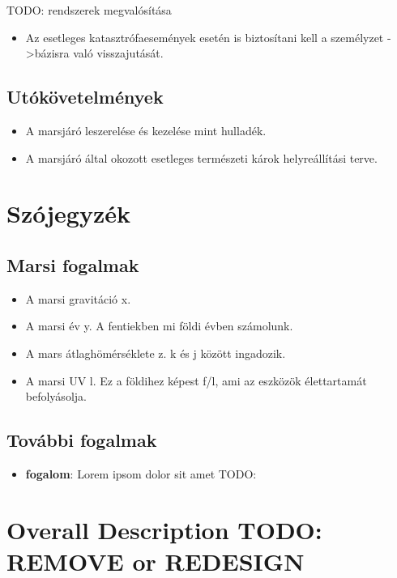 \documentclass[12pt]{report}
\begin{document}
TODO: rendszerek megvalósítása







\begin{itemize}
  \item Az esetleges katasztrófaesemények esetén is biztosítani kell a személyzet ->bázisra való visszajutását.
\end{itemize}
\section{Utókövetelmények}
\begin{itemize}
  \item A marsjáró leszerelése és kezelése mint hulladék.
  \item A marsjáró által okozott esetleges természeti károk helyreállítási terve.
\end{itemize}

\chapter{Szójegyzék}
\section{Marsi fogalmak}
\begin{itemize}
  \item A marsi gravitáció x.
  \item A marsi év y. A fentiekben mi földi évben számolunk.
  \item A mars átlaghömérséklete z. k és j között ingadozik.
  \item A marsi UV l. Ez a földihez képest f/l, ami az eszközök élettartamát befolyásolja.
\end{itemize}

\section{További fogalmak}

\begin{itemize}
  \item \textbf{fogalom}: Lorem ipsom dolor sit amet TODO:
\end{itemize}








\chapter{Overall Description TODO: REMOVE or REDESIGN}
\end{document}

